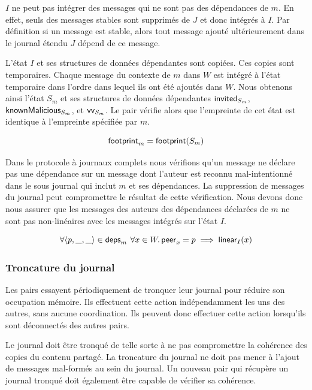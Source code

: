 \begin{remark}
$I$ ne peut pas intégrer des messages qui ne sont pas des dépendances de $m$.
En effet, seuls des messages stables sont supprimés de $J$ et donc intégrés à $I$.
Par définition si un message est stable, alors tout message ajouté ultérieurement dans le journal étendu $J$ dépend de ce message.
\end{remark}

L'état $I$ et ses structures de données dépendantes sont copiées.
Ces copies sont temporaires.
Chaque message du contexte de $m$ dans $W$ est intégré à l'état temporaire dans l'ordre dans lequel ils ont été ajoutés dans $W$.
Nous obtenons ainsi l'état $S_m$ et ses structures de données dépendantes $\operatorname{\mathsf{invited}}_{S_m}$, $\operatorname{\mathsf{knownMalicious}}_{S_m}$, et $\operatorname{\mathsf{vv}}_{S_m}$.
Le pair vérifie alors que l'empreinte de cet état est identique à l'empreinte spécifiée par $m$.

\begin{equation*}
    \operatorname{\mathsf{footprint}}_m = \operatorname{\mathsf{footprint}}(S_m)
\end{equation*}

Dans le protocole à journaux complets nous vérifions qu'un message ne déclare pas une dépendance sur un message dont l'auteur est reconnu mal-intentionné dans le sous journal qui inclut $m$ et ses dépendances.
La suppression de messages du journal peut compromettre le résultat de cette vérification.
Nous devons donc nous assurer que les messages des auteurs des dépendances déclarées de $m$ ne sont pas non-linéaires avec les messages intégrés sur l'état $I$.

\begin{equation}\label{eq:non-linear-I-verif}
    \forall \tuple*{p, \_, \_} \in \trm{deps}_m \:\forall x \in W \qsep \trm{peer}_x = p \implies \trm{linear}_I(x)
\end{equation}


\subsubsection{Troncature du journal}

Les pairs essayent périodiquement de tronquer leur journal pour réduire son occupation mémoire.
Ils effectuent cette action indépendamment les uns des autres, sans aucune coordination.
Ils peuvent donc effectuer cette action lorsqu'ils sont déconnectés des autres pairs.

Le journal doit être tronqué de telle sorte à ne pas compromettre la cohérence des copies du contenu partagé.
La troncature du journal ne doit pas mener à l'ajout de messages mal-formés au sein du journal.
Un nouveau pair qui récupère un journal tronqué doit également être capable de vérifier sa cohérence.

